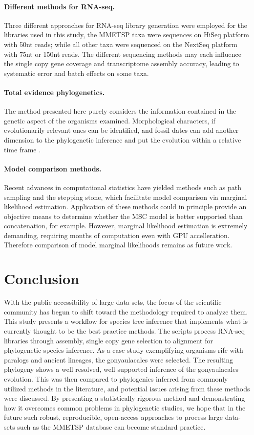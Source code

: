 \documentclass[fleqn,10pt,lineno]{wlpeerj} %
\begin{document}
\paragraph*{Different methods for RNA-seq.} 
Three different approaches for RNA-seq library generation were employed for the libraries used in this study, the MMETSP taxa were sequences on HiSeq platform with 50nt reads; while all other taxa were sequenced on the NextSeq platform with 75nt or 150nt reads. 
The different sequencing methods may each influence the single copy gene coverage and transcriptome assembly accuracy, leading to systematic error and batch effects on some taxa.
\paragraph*{Total evidence phylogenetics.}
The method presented here purely considers the information contained in the genetic aspect of the organisms examined. 
Morphological characters, if evolutionarily relevant ones can be identified, and fossil dates can add another dimension to the phylogenetic inference and put the evolution within a relative time frame \cite{gavryushkina2017bayesian}.  
\paragraph*{Model comparison methods.}
Recent advances in computational statistics have yielded methods such as path sampling and the stepping stone, which facilitate model comparison via marginal likelihood estimation. 
Application of these methods could in principle provide an objective means to determine whether the MSC model is better supported than concatenation, for example.
However, marginal likelihood estimation is extremely demanding, requiring months of computation even with GPU accelleration.
Therefore comparison of model marginal likelihoods remains as future work.

\section*{Conclusion}
With the public accessibility of large data sets, the focus of the scientific community has begun to shift toward the methodology required to analyze them. 
This study presents a workflow for species tree inference that implements what is currently thought to be the best practice methods. 
The scripts process RNA-seq libraries through assembly, single copy gene selection to alignment for phylogenetic species inference. 
As a case study exemplifying organisms rife with paralogs and ancient lineages, the gonyaulacales were selected. 
The resulting phylogeny shows a well resolved, well supported inference of the gonyaulacales evolution. 
This was then compared to phylogenies inferred from commonly utilized methods in the literature, and potential issues arising from these methods were discussed. 
By presenting a statistically rigorous method and demonstrating how it overcomes common problems in phylogenetic studies, we hope that in the future such robust, reproducible, open-access approaches to process large data-sets such as the MMETSP database can become standard practice.
\end{document}

